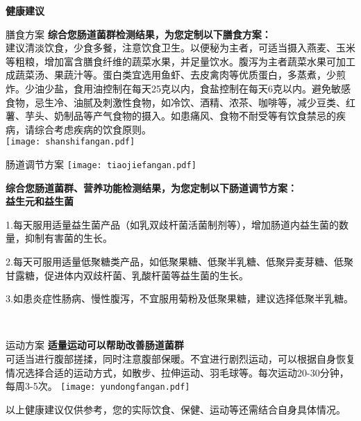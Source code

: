 

\usepackage{graphicx}
\graphicspath{{cores/}}



\vspace*{6mm}
\setlength{\arrayrulewidth}{1pt}
\fontsize{9.3pt}{11pt}\selectfont
\color{gray2}

\centerline{\bf\sanhao 健康建议}

\vspace*{2mm}

\begin{LRaside}[.20]{膳食方案}
{\bf *综合您肠道菌群检测结果，为您定制以下膳食方案：}\\
{\indent 建议清淡饮食，少食多餐，注意饮食卫生。以便秘为主者，可适当摄入燕麦、玉米等粗粮，增加富含膳食纤维的蔬菜水果，并足量饮水。腹泻为主者蔬菜水果可加工成蔬菜汤、果蔬汁等。蛋白类宜选用鱼虾、去皮禽肉等优质蛋白，多蒸煮，少煎炸。少油少盐，食用油控制在每天25克以内，食盐控制在每天6克以内。避免敏感食物，忌生冷、油腻及刺激性食物，如冷饮、酒精、浓茶、咖啡等，减少豆类、红薯、芋头、奶制品等产气食物的摄入。如患痛风、食物不耐受等有饮食禁忌的疾病，请综合考虑疾病的饮食原则。}\\
\asidebreak %
\noindent
\texttt{[image: shanshifangan.pdf]}

\end{LRaside}


\begin{LRaside}[.70]{肠道调节方案}
\noindent
\texttt{[image: tiaojiefangan.pdf]}

\asidebreak %
{\bf *综合您肠道菌群、营养功能检测结果，为您定制以下肠道调节方案：}\\
{\bf 益生元和益生菌}\\{\indent 1.每天服用适量益生菌产品（如乳双歧杆菌活菌制剂等），增加肠道内益生菌的数量，抑制有害菌的生长。

2.每天可服用适量低聚糖类产品，如低聚果糖、低聚半乳糖、低聚异麦芽糖、低聚甘露糖，促进体内双歧杆菌、乳酸杆菌等益生菌的生长。 

3.如患炎症性肠病、慢性腹泻，不宜服用菊粉及低聚果糖，建议选择低聚半乳糖。}\\
\end{LRaside}

\begin{LRaside}[.20]{运动方案}
{\bf *适量运动可以帮助改善肠道菌群}\\
{\indent 可适当进行腹部搓揉，同时注意腹部保暖。不宜进行剧烈运动，可以根据自身恢复情况选择合适的运动方式，如散步、拉伸运动、羽毛球等。每次运动20-30分钟，每周3-5次。}
\asidebreak %
\noindent
\texttt{[image: yundongfangan.pdf]}

\end{LRaside}

{\noindent\qihao *以上健康建议仅供参考，您的实际饮食、保健、运动等还需结合自身具体情况。}


